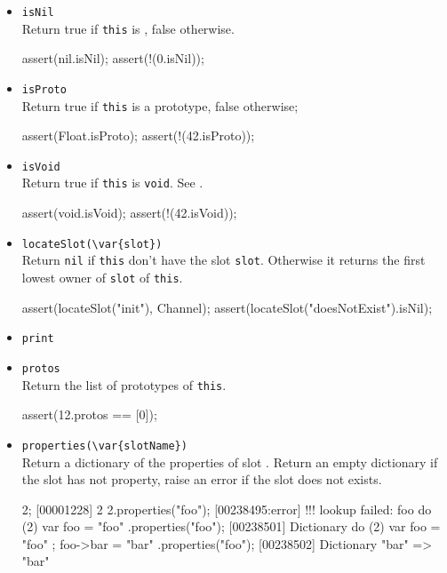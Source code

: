 \begin{itemize}
\item \lstinline|isNil|\\
  Return true if \lstinline|this| is , false otherwise.

\begin{urbiscript}[firstnumber=last]
assert(nil.isNil);
assert(!(0.isNil));
\end{urbiscript}

\item \lstinline|isProto|\\
  Return true if \lstinline|this| is a prototype, false otherwise;

\begin{urbiscript}[firstnumber=last]
assert(Float.isProto);
assert(!(42.isProto));
\end{urbiscript}

\item \lstinline|isVoid|\\
  Return true if \lstinline|this| is \lstinline|void|.  See
  .
\begin{urbiscript}[firstnumber=last]
assert(void.isVoid);
assert(!(42.isVoid));
\end{urbiscript}

\item \lstinline|locateSlot(\var{slot})|\\
  Return \lstinline|nil| if \lstinline|this| don't have the slot
  \lstinline|slot|. Otherwise it returns the first lowest owner of
  \lstinline|slot| of \lstinline|this|.

\begin{urbiscript}[firstnumber=last]
assert(locateSlot("init"), Channel);
assert(locateSlot("doesNotExist").isNil);
\end{urbiscript}

\item \lstinline|print|\\

\item \lstinline|protos|\\
  Return the list of prototypes of \lstinline|this|.
\begin{urbiscript}[firstnumber=last]
assert(12.protos == [0]);
\end{urbiscript}

\item \lstinline|properties(\var{slotName})|\\
  Return a dictionary of the properties of slot .
  Return an empty dictionary if the slot has not property, raise an
  error if the slot does not exists.
\begin{urbiscript}[firstnumber=last]
2;
[00001228] 2
2.properties("foo");
[00238495:error] !!! lookup failed: foo
do (2) { var foo = "foo" }.properties("foo");
[00238501] Dictionary {}
do (2) { var foo = "foo" ; foo->bar = "bar" }.properties("foo");
[00238502] Dictionary {"bar" => "bar"}
\end{urbiscript}


\end{itemize}
